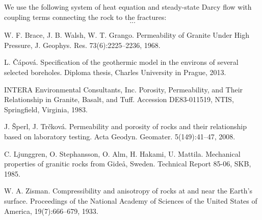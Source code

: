 \documentclass{article}
\begin{document}
We use the following system of heat equation and steady-state Darcy flow with coupling terms connecting the rock to the fractures:
\[ ... \]


\begin{thebibliography}{9}

 W. F. Brace,  J. B. Walsh, W. T. Grango.  Permeability of Granite Under High Pressure, J. Geophys. Res. 73(6):2225--2236, 1968.

 L. Čápová. Specification of the geothermic model in the environs of several selected boreholes. Diploma thesis, Charles University in Prague, 2013.

 INTERA Environmental Consultants, Inc. Porosity, Permeability,  and Their  Relationship  in  
Granite,  Basalt, and Tuff. Accession  DE83-011519, NTIS, Springfield, Virginia, 1983.

 J. Šperl, J. Trčková. Permeability and porosity of rocks and their relationship based on laboratory testing. Acta Geodyn. Geomater. 5(149):41--47, 2008.

 C. Ljunggren, O. Stephansson, O. Alm, H. Hakami, U. Mattila. Mechanical properties of granitic rocks from Gide\aa, Sweden. Technical Report 85-06, SKB, 1985.

 W. A. Zisman. Compressibility and anisotropy of rocks at and near the Earth's surface. Proceedings of the National Academy of Sciences of the United States of America, 19(7):666--679, 1933.

\end{thebibliography}
\end{document}
